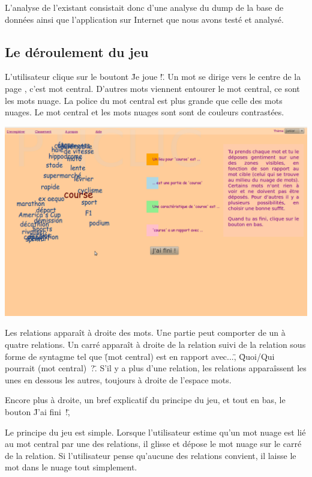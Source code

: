 \documentclass[a4paper,11pt,french]{article}
\begin{document}
L'analyse de l'existant consistait donc d'une analyse du dump de la base de données ainsi que l'application sur Internet que nous avons testé et analysé.

\subsection{Le déroulement du jeu}
L'utilisateur clique sur le boutont \"Je joue !\". Un mot se dirige vers le centre de la page , c'est mot central. D'autres mots viennent entourer le mot central, ce sont les mots nuage. La police du mot central est plus grande que celle des mots nuages. Le mot central et les mots nuages sont sont de couleurs contrastées.

\begin{center}
\includegraphics[width=14cm]{img/PtiClicJeu.png}
\end{center}

Les relations apparaît à droite des mots. Une partie peut comporter de un à quatre relations. Un carré apparaît à droite de la relation suivi de la relation sous forme de syntagme tel que \"(mot central) est en rapport avec...\", \"Quoi/Qui pourrait (mot central)~?\". S'il y a plus d'une relation, les relations apparaîssent les unes en dessous les autres, toujours à droite de l'espace mots.

Encore plus à droite, un bref explicatif du principe du jeu, et tout en bas, le bouton \"J'ai fini~!\", 

Le principe du jeu est simple. Lorsque l'utilisateur estime qu'un mot nuage est lié au mot central par une des relations, il glisse et dépose le mot nuage sur le carré de la relation. Si l'utilisateur pense qu'aucune des relations convient, il laisse le mot dans le nuage tout simplement. 
\end{document}
